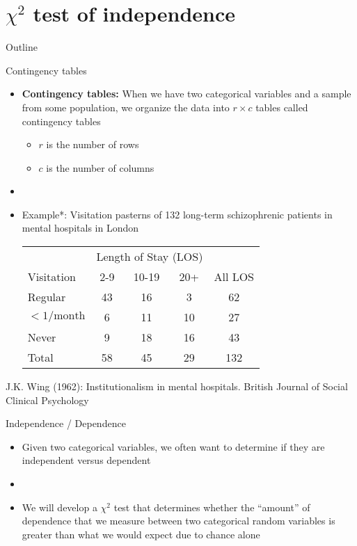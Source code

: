 \documentclass[xcolor=dvipsnames]{beamer}
\begin{document}
\section{$\chi^2$ test of independence}
\begin{frame}{Outline}
\tableofcontents[currentsection,subsectionstyle=show/shaded/hide]
\end{frame}

\begin{frame}{Contingency tables}
	\begin{itemize}
		\item \textbf{Contingency tables:} When we have two categorical variables and a sample from some population, we organize the data into $r\times c$ tables called contingency tables  \pause
		\begin{itemize}
			\item $r$ is the number of rows  \pause
			\item $c$ is the number of columns  \pause
		\end{itemize}
		\item[]
		\item Example*: Visitation pasterns of 132 long-term schizophrenic patients in mental hospitals in London
		\begin{center}
			\begin{tabular}{|l|ccc|c|}
				\hline
				& \multicolumn{3}{c|}{Length of Stay (LOS)} & \\
				Visitation & 2-9 & 10-19 & 20+ & All LOS \\ \hline
				Regular & 43 & 16 & 3 & 62\\ 
				$<1/\text{month}$ & 6 & 11 & 10 & 27 \\
				Never & 9 & 18 & 16 & 43\\ \hline
				Total & 58 & 45 & 29 & 132\\ \hline
			\end{tabular}
		\end{center}
	\end{itemize}
{\tiny *J.K. Wing (1962): Institutionalism in mental hospitals. British Journal of Social Clinical Psychology}
\end{frame}

\begin{frame}{Independence / Dependence}
	\begin{itemize}
		\item Given two categorical variables, we often want to determine if they are independent versus dependent  \pause
		\item[]
		\item We will develop a $\chi^2$ test that determines whether the ``amount'' of dependence that we measure between two categorical random variables is greater than what we would expect due to chance alone 
	\end{itemize}
\end{frame}
\end{document}
